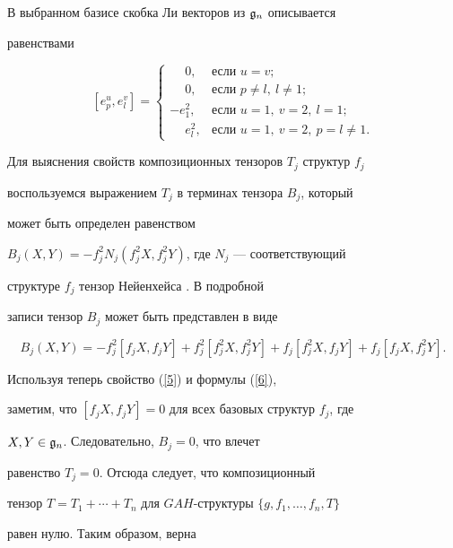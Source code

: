 В выбранном базисе скобка Ли векторов из $\frak{g}_n$ описывается


равенствами


\begin{equation}\label{6}


[e^u_p,e^v_l]=\begin{cases}


\phantom{-}0, & \text{если } u=v; \\


\phantom{-}0, & \text{если } p\ne l,\ l\ne 1; \\


-e^2_1, & \text{если } u=1,\ v=2,\ l=1; \\


\phantom{-}e^2_l, & \text{если } u=1,\ v=2,\ p=l\ne 1.


\end{cases}


\end{equation}





Для выяснения свойств композиционных тензоров $T_j$ структур $f_j$


воспользуемся выражением $T_j$ в терминах тензора $B_j$, который


может быть определен равенством


$B_j(X,Y)=-f_j^2N_j(f_j^2X,f_j^2Y)$, где $N_j$ --- соответствующий


структуре $f_j$ тензор Нейенхейса \cite{4}. В подробной


записи тензор $B_j$ может быть представлен в виде


$$


B_j(X,Y)=-f_j^2[f_jX,f_jY]+f_j^2[f_j^2X,f_j^2Y]+


f_j[f_j^2X,f_jY]+f_j[f_jX,f_j^2Y].


$$





Используя теперь свойство (\ref{5}) и формулы (\ref{6}), 


заметим, что $[f_jX,f_jY]=0$ для всех базовых структур $f_j$, где


$X,Y\in\frak{g}_n$. Следовательно, $B_j=0$, что влечет 


\cite{4} равенство $T_j=0$. Отсюда следует, что композиционный


тензор $T=T_1+\dotsb+T_n$ для $GAH$-структуры $\{g,f_1,\dotsc, f_n, T\}$


равен нулю. Таким образом, верна 






